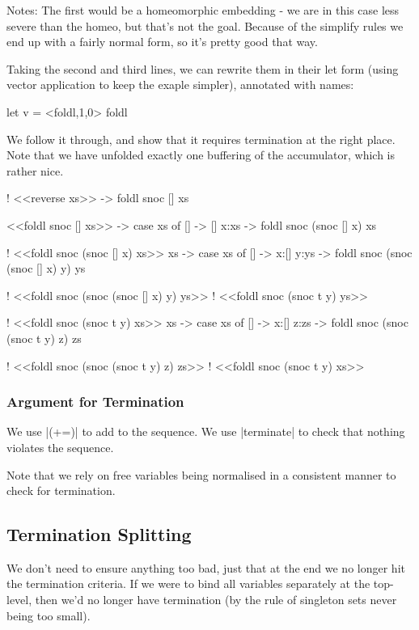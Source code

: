 \documentclass[draft]{sigplanconf}
\begin{document}
Notes: The first would be a homeomorphic embedding - we are in this case less severe than the homeo, but that's not the goal. Because of the simplify rules we end up with a fairly normal form, so it's pretty good that way.



Taking the second and third lines, we can rewrite them in their let form (using vector application to keep the exaple simpler), annotated with names:

\begin{code}
let v = <foldl,1,0> foldl
    

We follow it through, and show that it requires termination at the right place. Note that we have unfolded exactly one buffering of the accumulator, which is rather nice.

\begin{code}
! <<reverse xs>>
\xs -> foldl snoc [] xs

<<foldl snoc [] xs>>
\xs -> case xs of
    [] -> []
    x:xs -> foldl snoc (snoc [] x) xs

! <<foldl snoc (snoc [] x) xs>>
\x xs -> case xs of
    [] -> x:[]
    y:ys -> foldl snoc (snoc (snoc [] x) y) ys

! <<foldl snoc (snoc (snoc [] x) y) ys>>
! <<foldl snoc (snoc t y) ys>>

! <<foldl snoc (snoc t y) xs>>
\x xs -> case xs of
    [] -> x:[]
    z:zs -> foldl snoc (snoc (snoc t y) z) zs

! <<foldl snoc (snoc (snoc t y) z) zs>>
! <<foldl snoc (snoc t y) xs>>
\end{code}


\subsubsection{Argument for Termination}

We use |(+=)| to add to the sequence. We use |terminate| to check that nothing violates the sequence.

Note that we rely on free variables being normalised in a consistent manner to check for termination.

\subsection{Termination Splitting}
\label{sec:term_split}

We don't need to ensure anything too bad, just that at the end we no longer hit the termination criteria. If we were to bind all variables separately at the top-level, then we'd no longer have termination (by the rule of singleton sets never being too small).


\end{code}
\end{document}
